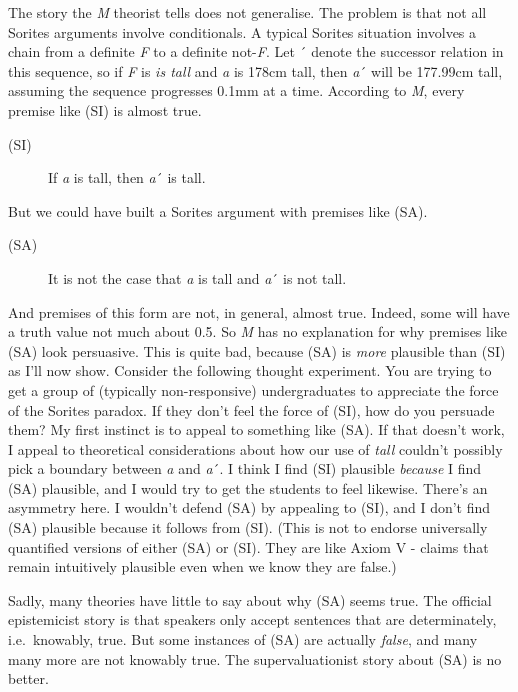 \documentclass[
  11pt,
  letterpaper,
  DIV=11,
  numbers=noendperiod,
  twoside]{scrartcl}
\begin{document}
The story the \emph{M} theorist tells does not generalise. The problem
is that not all Sorites arguments involve conditionals. A typical
Sorites situation involves a chain from a definite \emph{F} to a
definite not-\emph{F}. Let ´ denote the successor relation in this
sequence, so if \emph{F} is \emph{is tall} and \emph{a} is 178cm tall,
then \emph{a}´ will be 177.99cm tall, assuming the sequence progresses
0.1mm at a time. According to \emph{M}, every premise like (SI) is
almost true.

\begin{description}
\item[(SI)]
If \emph{a} is tall, then \emph{a}´ is tall.
\end{description}

But we could have built a Sorites argument with premises like (SA).

\begin{description}
\item[(SA)]
It is not the case that \emph{a} is tall and \emph{a}´ is not tall.
\end{description}

And premises of this form are not, in general, almost true. Indeed, some
will have a truth value not much about 0.5. So \emph{M} has no
explanation for why premises like (SA) look persuasive. This is quite
bad, because (SA) is \emph{more} plausible than (SI) as I'll now show.
Consider the following thought experiment. You are trying to get a group
of (typically non-responsive) undergraduates to appreciate the force of
the Sorites paradox. If they don't feel the force of (SI), how do you
persuade them? My first instinct is to appeal to something like (SA). If
that doesn't work, I appeal to theoretical considerations about how our
use of \emph{tall} couldn't possibly pick a boundary between \emph{a}
and \emph{a}´. I think I find (SI) plausible \emph{because} I find (SA)
plausible, and I would try to get the students to feel likewise. There's
an asymmetry here. I wouldn't defend (SA) by appealing to (SI), and I
don't find (SA) plausible because it follows from (SI). (This is not to
endorse universally quantified versions of either (SA) or (SI). They are
like Axiom V - claims that remain intuitively plausible even when we
know they are false.)

Sadly, many theories have little to say about why (SA) seems true. The
official epistemicist story is that speakers only accept sentences that
are determinately, i.e.~knowably, true. But some instances of (SA) are
actually \emph{false}, and many many more are not knowably true. The
supervaluationist story about (SA) is no better.
\end{document}
